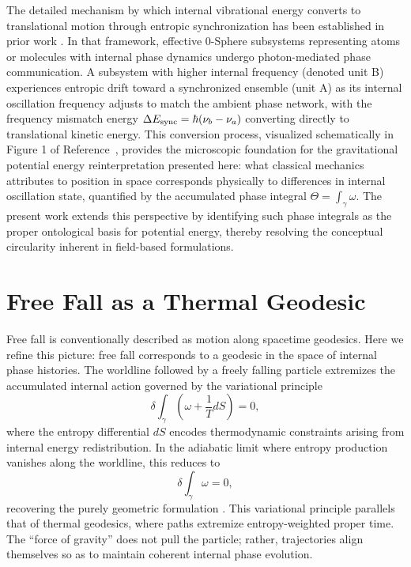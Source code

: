 \documentclass[%
 reprint,
 amsmath,amssymb,
 aps,
 prb,
]{revtex4-2}
\numberwithin{equation}{section}
\begin{document}
The detailed mechanism by which internal vibrational energy converts to translational motion through entropic synchronization has been established in prior work \cite{Hanamura2026Geometrical}. In that framework, effective 0-Sphere subsystems representing atoms or molecules with internal phase dynamics undergo photon-mediated phase communication. A subsystem with higher internal frequency (denoted unit B) experiences entropic drift toward a synchronized ensemble (unit A) as its internal oscillation frequency adjusts to match the ambient phase network, with the frequency mismatch energy $\Delta E_{\rm sync} = \hbar(\nu_b - \nu_a)$ converting directly to translational kinetic energy. This conversion process, visualized schematically in Figure 1 of Reference~\cite{Hanamura2026Geometrical}, provides the microscopic foundation for the gravitational potential energy reinterpretation presented here: what classical mechanics attributes to position in space corresponds physically to differences in internal oscillation state, quantified by the accumulated phase integral $\Theta = \int_\gamma \omega$. The present work extends this perspective by identifying such phase integrals as the proper ontological basis for potential energy, thereby resolving the conceptual circularity inherent in field-based formulations.


\section{Free Fall as a Thermal Geodesic}
\label{sec:thermal_geodesic}

Free fall is conventionally described as motion along spacetime geodesics. Here we refine this picture: free fall corresponds to a geodesic in the space of internal phase histories. The worldline followed by a freely falling particle extremizes the accumulated internal action governed by the variational principle
\begin{equation}
\delta \int_{\gamma} \left(\omega + \frac{1}{T}dS\right) = 0,
\label{eq:thermal_geodesic_full}
\end{equation}
where the entropy differential $dS$ encodes thermodynamic constraints arising from internal energy redistribution. In the adiabatic limit where entropy production vanishes along the worldline, this reduces to
\begin{equation}
\delta \int_{\gamma} \omega = 0,
\label{eq:thermal_geodesic}
\end{equation}
recovering the purely geometric formulation \cite{Hanamura2025ThermalGeod}. This variational principle parallels that of thermal geodesics, where paths extremize entropy-weighted proper time. The ``force of gravity'' does not pull the particle; rather, trajectories align themselves so as to maintain coherent internal phase evolution.
\end{document}
